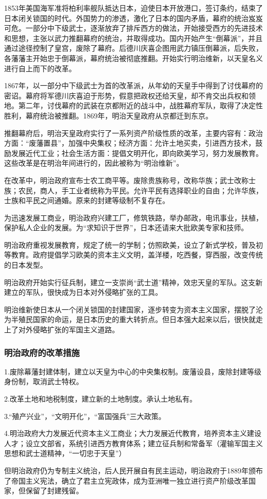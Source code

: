 1853年美国海军准将柏利率舰队抵达日本，迫使日本开放港口，签订条约，结束了日本闭关锁国的时代。外国势力的渗透，激化了日本的国内矛盾，幕府的统治岌岌可危。一部分中下级武士，逐渐放弃了排斥西方的做法，开始接受西方的先进技术和思想，主张以武力推翻幕府的统治，并取得成功。国内开始产生“倒幕派”，并且通过途径控制了皇宫，废除了幕府。后德川庆喜企图用武力镇压倒幕派，后失败，各藩藩主开始忠于倒幕派，幕府统治被彻底推翻。开始实行明治维新，以天皇名义进行自上而下的改革。

1867年，以一部分中下级武士为首的改革派，从年幼的天皇手中得到了讨伐幕府的密诏。幕府将军德川庆喜迫于形势，假意把政权还给天皇，却不肯交出兵权和领地。第二年，讨伐幕府的武装在京都附近的战斗中，战胜幕府军队，取得了决定性胜利，幕府统治被推翻。1869年，明治天皇政府从京都迁到东京。

推翻幕府后，明治天皇政府实行了一系列资产阶级性质的改革，主要内容有：政治方面：“废藩置县”，加强中央集权；经济方面：允许土地买卖，引进西方技术，鼓励发展近代工业；社会生活方面：提倡文明开化，即向欧美学习，努力发展教育。这些改革是在明治年间进行的，因此被称为“明治维新”。

在改革中，明治政府宣布士农工商平等。废除贵族称号，改称华族；武士改称士族；农民，商人，手工业者统称为平民。允许平民有选择职业的自由；允许华族，士族和平民之间通婚。原来的封建等级制不复存在。

为迅速发展工商业，明治政府兴建工厂，修筑铁路，举办邮政，电讯事业，扶植，保护私人企业的发展。为“求知识于世界”，日本还请来大批欧美专家和技师。

明治政府重视发展教育，规定了统一的学制；仿照欧美，设立了新式学校，普及初等教育。政府提倡学习欧美的资本主义文明，盖洋楼，吃西餐，穿西服，改变传统的日本发型。

明治政府开始实行征兵制，建立一支崇尚“武士道”精神，效忠天皇的军队。这支新建立的军队，很快成为日本对外侵略扩张的工具。

明治维新使日本从一个闭关锁国的封建国家，逐步转变为资本主义国家，摆脱了沦为半殖民国家的命运，是日本历史的重大转折点。但日本强大起来以后，很快就走上了对外侵略扩张的军国主义道路。

\subsubsection{明治政府的改革措施}
1.废除幕藩封建体制，建立以天皇为中心的中央集权制。废藩设县，废除封建等级身份制，取消武士特权。

2.改革土地和地税制度，建立新的土地制度。承认土地私有。

3.“殖产兴业”，“文明开化”，“富国强兵”三大政策。

4.明治政府大力发展近代资本主义工商业；大力发展近代教育，培养资本主义建设人才；设立文部省，系统引进西方教育体系；建立征兵制和常备军（灌输军国主义思想和武士道精神，“一切忠于天皇”）

但明治政府仍为专制主义统治，后人民开展自有民主运动，明治政府于1889年颁布了帝国主义宪法，确立了君主立宪政体，成为亚洲唯一独立进行资产阶级改革国家，但保留了封建残留。

